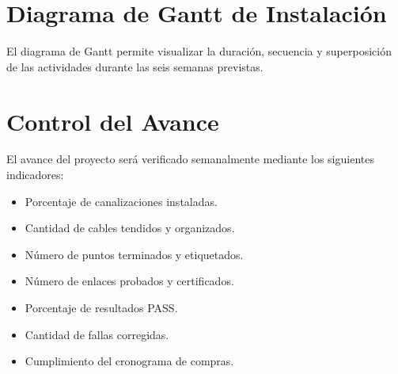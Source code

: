 \section{Diagrama de Gantt de Instalación}

El diagrama de Gantt permite visualizar la duración, secuencia y superposición de las actividades durante las seis semanas previstas.

\begin{table}[H]
\centering
\caption{Diagrama de Gantt de la instalación.}
\label{tab:gantt}
\end{table}

\section{Control del Avance}

El avance del proyecto será verificado semanalmente mediante los siguientes indicadores:

\begin{itemize}
    \item Porcentaje de canalizaciones instaladas.
    \item Cantidad de cables tendidos y organizados.
    \item Número de puntos terminados y etiquetados.
    \item Número de enlaces probados y certificados.
    \item Porcentaje de resultados PASS.
    \item Cantidad de fallas corregidas.
    \item Cumplimiento del cronograma de compras.
\end{itemize}

